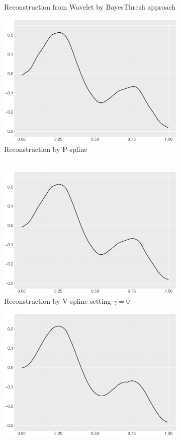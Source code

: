 \begin{figure}
\begin{subfigure}{0.45\textwidth}
    \caption{Reconstruction from Wavelet by BayesThresh approach}
    \end{subfigure}
    \begin{subfigure}{0.45\textwidth}
    \centering
    \includegraphics[width=\linewidth,height=0.45\textwidth]{Chapters/02TractorSplineTheory/plot/ggplot/ggHeaviSinePSpline.pdf}
    \caption{Reconstruction by P-spline \\\mbox{  } }
    \end{subfigure}
    \begin{subfigure}{0.45\textwidth}
    \centering
    \includegraphics[width=\linewidth,height=0.45\textwidth]{Chapters/02TractorSplineTheory/plot/ggplot/ggHeaviSineGamma.pdf}
    \caption{Reconstruction by V-spline setting $\gamma=0$}
    \end{subfigure}
  \begin{subfigure}{0.45\textwidth}
    \centering
    \includegraphics[width=\linewidth,height=0.45\textwidth]{Chapters/02TractorSplineTheory/plot/ggplot/ggHeaviSineTractorAPT.pdf}

\end{subfigure}
\end{figure}
